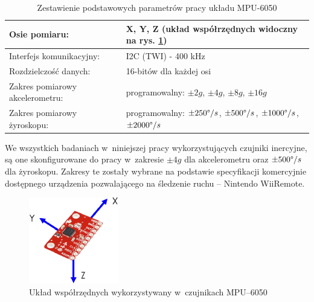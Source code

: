 \begin{table}[!htp]
	\caption[Zestawienie podstawowych parametrów pracy układu MPU-6050]{Zestawienie podstawowych parametrów pracy układu MPU-6050}
	\label{tab:characteristics:mpu:spec}
	\noindent
	\small
	\centering
	\begin{tabular}{|p{5cm}|p{8cm}|}
		\hline 
		Osie pomiaru:                             & X, Y, Z \newline (układ współrzędnych widoczny na rys. \ref{fig:characteristics:imu:space})               \\
		\hline
		Interfejs komunikacyjny:                  & I2C (TWI) - 400 kHz                                                                                           \\
		\hline
		Rozdzielczość danych:                   & 16-bitów dla każdej osi                                                                                     \\
		\hline
		Zakres pomiarowy  \newline akcelerometru: & programowalny: \newline $\pm2g$, \textbf{$\pm4g$}, $\pm8g$, $\pm16g$                                          \\
		\hline
		Zakres pomiarowy żyroskopu:              & programowalny: \newline $\pm250\degree/s$, \textbf{$\pm500\degree/s$}, $\pm1000\degree/s$, $\pm2000\degree/s$ \\
		\hline
	\end{tabular} 	
\end{table} 
																																									
We wszystkich badaniach w~niniejszej pracy wykorzystujących czujniki inercyjne, są one skonfigurowane do pracy w~zakresie  $\pm4g$ dla akcelerometru oraz $\pm500\degree/s$dla żyroskopu. Zakresy te zostały wybrane na podstawie specyfikacji komercyjnie dostępnego urządzenia pozwalającego na śledzenie ruchu -- Nintendo WiiRemote.
																																									
\begin{savenotes}
	\begin{figure}[!htp]
		\centering 
		\includegraphics[width=0.35\textwidth]{images/imuCoordinationSpace.eps}	
		\caption{Układ współrzędnych wykorzystywany w~czujnikach MPU--6050}
		\label{fig:characteristics:imu:space}
	\end{figure}
\end{savenotes}
																																											
